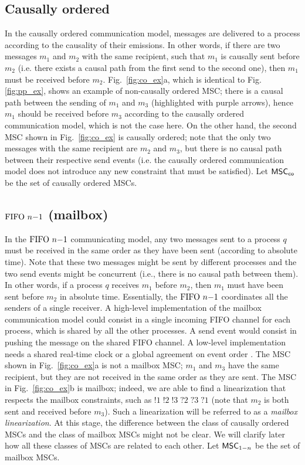 \subsection{Causally ordered}
In the causally ordered communication model, messages are delivered to a process according to the causality of their emissions. In other words, if there are two messages $m_1$ and $m_2$ with the same recipient, such that $m_1$ is causally sent before $m_2$ (i.e. there exists a causal path from the first send to the second one), then $m_1$ must be received before $m_2$. Fig.~\ref{fig:co_ex}a, which is identical to Fig.\ref{fig:pp_ex}, shows an example of non-causally ordered MSC; there is a causal path between the sending of $m_1$ and $m_3$ (highlighted with purple arrows), hence $m_1$ should be received before $m_3$ according to the causally ordered communication model, which is not the case here. On the other hand, the second MSC shown in Fig.~\ref{fig:co_ex} is causally ordered; note that the only two messages with the same recipient are $m_2$ and $m_3$, but there is no causal path between their respective send events (i.e. the causally ordered communication model does not introduce any new constraint that must be satisfied). Let $\mathsf{MSC}_{\mathsf{co}}$ be the set of causally ordered MSCs.



\subsection{$\text{FIFO } n\mathsf{-}1$ (mailbox)}
In the $\text{FIFO } n\mathsf{-}1$ communicating model, any two messages sent to a process $q$ must be received in the same order as they have been sent (according to absolute time). Note that these two messages might be sent by different processes and the two send events might be concurrent (i.e., there is no causal path between them). In other words, if a process $q$ receives $m_1$ before $m_2$, then $m_1$ must have been sent before $m_2$ in absolute time. Essentially, the $\text{FIFO } n\mathsf{-}1$ coordinates all the senders of a single receiver. A high-level implementation of the mailbox communication model could consist in a single incoming FIFO channel for each process, which is shared by all the other processes. A send event would consist in pushing the message on the shared FIFO channel.
A low-level implementation needs a shared real-time clock \cite{cristian1999timed} or a global agreement on event order \cite{defago2004total, raynal2010communication}.
The MSC shown in Fig.~\ref{fig:co_ex}a is not a mailbox MSC; $m_1$ and $m_3$ have the same recipient, but they are not received in the same order as they are sent. The MSC in Fig.~\ref{fig:co_ex}b is mailbox; indeed, we are able to find a linearization that respects the mailbox constraints, such as $!1\;!2\;!3\;?2\;?3\;?1$ (note that $m_2$ is both sent and received before $m_3$). Such a linearization will be referred to as a \emph{mailbox linearization}. At this stage, the difference between the class of causally ordered MSCs and the class of mailbox MSCs might not be clear. We will clarify later how all these classes of MSCs are related to each other. Let $\mathsf{MSC}_{1\mathsf{-}n}$ be the set of mailbox MSCs.

